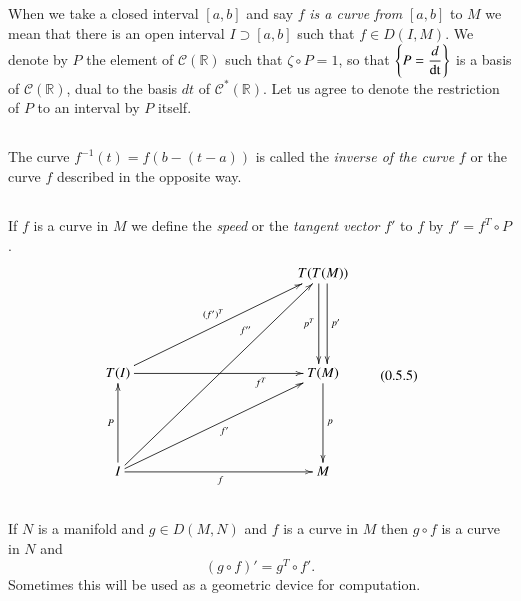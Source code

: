 \setcounter{subsection}{1}
\subsection{}\label{chap0:0.5.2}
\pageoriginale
When we take a closed interval $[a,b]$ and say $f$ {\em is a curve
from} $[a,b]$ to $M$ we mean that there is an open interval $I\supset
[a,b]$ such that $f\in D(I,M)$. We denote by $P$ the element of
$\mathscr{C}(\mathbb{R})$ such that $\zeta\circ P=1$, so that
$\left\{P=\dfrac{d}{\operatorname{dt}}\right\}$ is a basis of
$\mathscr{C}(\mathbb{R})$, dual to the basis $dt$ of
$\mathscr{C}^{\ast}(\mathbb{R})$. Let us agree to denote the
restriction of $P$ to an interval by $P$ itself.

\subsection{}\label{chap0:0.5.3}

The curve $f^{-1}(t)=f(b-(t-a))$ is called the {\em inverse of the
curve} $f$ or the curve $f$ described in the opposite way.

\setcounter{definition}{3}

\subsection{}\label{chap0:0.5.4}

\begin{defi*}
If $f$ is a curve in $M$ we define the {\em speed} or the {\em tangent
vector} $f'$ to $f$ by $f'=f^{T}\circ P$.
\begin{equation*}
\vcenter{\xymatrix@R=2cm@C=4cm{
 & T(T(M))\ar@<-3pt>[d]_{p^{T}}\ar@<+3pt>[d]^{p'}\\
T(I)\ar[ur]^{(f')^{T}}\ar[r]_>>>>>>>>>>>{f^{T}} & T(M)\ar[d]^{p}\\
I\ar[u]^{P}\ar[uur]^>>>>>>>>>>>>>>>>>>>>{f''}\ar[ur]_{f'}\ar[r]_{f} & M
}}\tag{0.5.5}\label{chap0:0.5.5}
\end{equation*}
\end{defi*}

\setcounter{subsection}{6}

\subsection{}\label{chap0:0.5.7}


\begin{remarks*}
If $N$ is a manifold and $g\in D(M,N)$ and $f$ is a curve in $M$ then
$g\circ f$ is a curve in $N$ and
$$
(g\circ f)'=g^{T}\circ f'.
$$
Sometimes this will be used as a geometric device for computation.
\end{remarks*}

